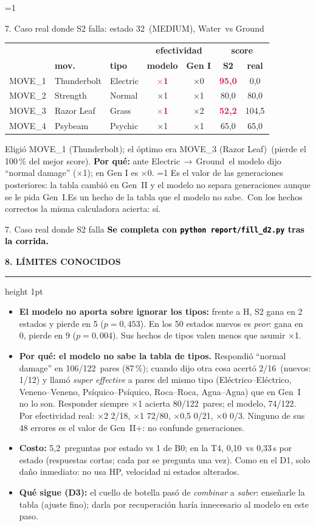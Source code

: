 \documentclass[10pt,a4paper]{extarticle}
\newcommand{\ph}[1]{\colorbox{yellow!60}{\textcolor{black}{\textbf{#1}}}}
\newcommand{\callsStwo}{5{,}2}
\newcommand{\constOne}{80/122}
\newcommand{\factPairs}{122}
\newcommand{\factRight}{74}
\newcommand{\fcAtk}{Electric}
\newcommand{\fcChosen}{MOVE\_1 (Thunderbolt)}
\newcommand{\fcDef}{Ground}
\newcommand{\fcDiff}{MEDIUM}
\newcommand{\fcEnemy}{Ground}
\newcommand{\fcFixed}{s\'i}
\newcommand{\fcId}{32}
\newcommand{\fcIsModern}{0}
\newcommand{\fcModel}{1}
\newcommand{\fcOptimal}{MOVE\_3 (Razor Leaf)}
\newcommand{\fcPlayer}{Water}
\newcommand{\fcRegret}{100}
\newcommand{\fcSaid}{normal damage}
\newcommand{\fcTruth}{0}
\newcommand{\genBullet}{Ninguno de sus 48 errores es el valor de Gen~II+: no confunde generaciones.}
\newcommand{\hasFailure}{1}
\newcommand{\neutralPct}{87}
\newcommand{\neutralShare}{106/122}
\newcommand{\nonNeutral}{2/16}
\newcommand{\nonNeutralH}{1/12}
\newcommand{\recallHalf}{0/21}
\newcommand{\recallOne}{72/80}
\newcommand{\recallTwo}{2/18}
\newcommand{\recallZero}{0/3}
\newcommand{\sameSuper}{El\'ectrico--El\'ectrico, Veneno--Veneno, Ps\'iquico--Ps\'iquico, Roca--Roca, Agua--Agua}
\newcommand{\secsBaseH}{0{,}33}
\newcommand{\secsStwoH}{0{,}10}
\newcommand{\verdictSH}{\textbf{El modelo no aporta sobre ignorar los tipos:} frente a H, S2 gana en 2 estados y pierde en 5 ($p=0{,}453$). En los 50 estados nuevos es \emph{peor}: gana en 0, pierde en 9 ($p=0{,}004$). Sus hechos de tipos valen menos que asumir $\times$1.}
\newcommand{\fcTable}{MOVE\_1 & Thunderbolt & Electric & \textcolor{crimson}{\textbf{$\times$1}} & $\times$0 & \textcolor{crimson}{\textbf{95{,}0}} & 0{,}0\\
MOVE\_2 & Strength & Normal & $\times$1 & $\times$1 & 80{,}0 & 80{,}0\\
MOVE\_3 & Razor Leaf & Grass & \textcolor{crimson}{\textbf{$\times$1}} & $\times$2 & \textcolor{crimson}{\textbf{52{,}2}} & 104{,}5\\
MOVE\_4 & Psybeam & Psychic & $\times$1 & $\times$1 & 65{,}0 & 65{,}0\\}
\newcommand{\heading}[1]{%
  \par\vspace{1.2mm}\noindent
  {\color{navy}\bfseries\small\MakeUppercase{#1}}\par\vspace{0.5mm}
  {\color{amber}\hrule height 1pt}\vspace{0.9mm}\noindent\ignorespaces}
\begin{document}
\begin{minipage}[t]{0.488\linewidth}
\vspace{0.7mm}
\ifnum\hasFailure=1
\begin{failbox}{7. Caso real donde S2 falla: estado \fcId\ (\fcDiff), \fcPlayer\ vs \fcEnemy}
{\centering\scriptsize
\begin{tabular}{@{}lllcccc@{}}
& & & \multicolumn{2}{c}{\textbf{efectividad}} & \multicolumn{2}{c}{\textbf{score}}\\
& \textbf{mov.} & \textbf{tipo} & \textbf{modelo} & \textbf{Gen I} & \textbf{S2} & \textbf{real}\\
\midrule
\fcTable
\end{tabular}\par}
\vspace{0.2mm}
{\footnotesize Eligi\'o \fcChosen; el \'optimo era \fcOptimal\ (pierde el \fcRegret\,\% del mejor score). \textbf{Por qu\'e:} ante \fcAtk\,$\to$\,\fcDef\ el modelo dijo ``\fcSaid'' ($\times$\fcModel); en Gen I es $\times$\fcTruth.
\ifnum\fcIsModern=1 Es el valor de las generaciones posteriores: la tabla cambi\'o en Gen~II y el modelo no separa generaciones aunque se le pida Gen~I.\else Es un hecho de la tabla que el modelo no sabe.\fi\ Con los hechos correctos la misma calculadora acierta: \fcFixed.}
\end{failbox}
\else
\begin{failbox}{7. Caso real donde S2 falla}
\footnotesize \ph{Se completa con \texttt{python report/fill\_d2.py} tras la corrida.}
\end{failbox}
\fi

\heading{8. L\'imites conocidos}
\begin{itemize}
\item \verdictSH
\item \textbf{Por qu\'e: el modelo no sabe la tabla de tipos.} Respondi\'o ``normal damage'' en \neutralShare\ pares (\neutralPct\,\%); cuando dijo otra cosa acert\'o \nonNeutral\ (nuevos: \nonNeutralH) y llam\'o \emph{super effective} a pares del mismo tipo (\sameSuper) que en Gen~I no lo son. Responder siempre $\times$1 acierta \constOne\ pares; el modelo, \factRight/\factPairs. Por efectividad real: $\times$2 \recallTwo, $\times$1 \recallOne, $\times$0{,}5 \recallHalf, $\times$0 \recallZero. \genBullet
\item \textbf{Costo:} \callsStwo\ preguntas por estado vs 1 de B0; en la T4, \secsStwoH\ vs \secsBaseH\,s por estado (respuestas cortas; cada par se pregunta una vez). Como en el D1, solo da\~no inmediato: no usa HP, velocidad ni estados alterados.
\item \textbf{Qu\'e sigue (D3):} el cuello de botella pas\'o de \emph{combinar} a \emph{saber}: ense\~narle la tabla (ajuste fino); darla por recuperaci\'on har\'ia innecesario al modelo en este paso.
\end{itemize}
\end{minipage}
\end{document}
